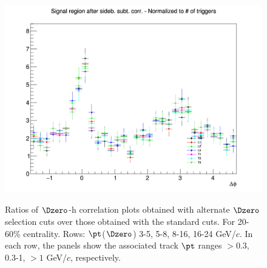 \begin{figure}
{\includegraphics[width=0.31\linewidth]{figuresVsCent/Dzero/SystDcuts/20_60/AzimCorrDistr_Dzero_Canvas_PtIntBins12to12_PoolInt_thr1to99_Superimp.png}} \\
 \caption{Ratios of $\Dzero$-h correlation plots obtained with alternate $\Dzero$ selection cuts over those obtained with the standard cuts. For 20-60\% centrality. Rows: $\pt$($\Dzero$) 3-5, 5-8, 8-16, 16-24 GeV/$c$. In each row, the panels show the associated track
$\pt$ ranges $> 0.3$, 0.3-1, $> 1$ GeV/$c$, respectively.}
\label{fig:SysDcut2060}
\end{figure}

